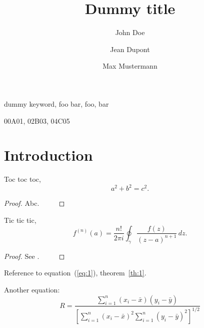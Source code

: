 \documentclass[draft,reqno]{etna}
\title{Dummy title}
\author{John Doe\footnotemark[1]
\and
Jean Dupont\footnotemark[1]
\and
Max Mustermann\footnotemark[2]
}
\begin{document}
\maketitle



\begin{abstract}
  \lipsum[1]
\end{abstract}

\begin{keywords}
   dummy keyword, foo bar, foo, bar
\end{keywords}

\begin{AMS}
  00A01, 02B03, 04C05
\end{AMS}

\section{Introduction}
\lipsum[2]

\begin{theorem}[Pythagoras]
Toc toc toc,
\begin{equation}
a^2 + b^2 = c^2.
\end{equation}
\end{theorem}
\begin{proof}
  Abc. $\qquad$
\end{proof}

\lipsum[3]

\begin{theorem}[Cauchy]\label{th:1}
  Tic tic tic,
  \begin{equation}\label{eq:1}
    f^{(n)}(a) = \frac{n!}{2\pi i} \oint_\gamma \frac{f(z)}{(z-a)^{n+1}}\, dz.
  \end{equation}
\end{theorem}
\begin{proof}
See \cite{cauchy1821cours}. $\qquad$
\end{proof}

Reference to equation~(\ref{eq:1}), theorem~\ref{th:1}.

Another equation:
\begin{equation}
  R = \frac{\displaystyle{\sum_{i=1}^n (x_i-\bar{x})(y_i-
\bar{y})}}{\displaystyle{\left[
\sum_{i=1}^n(x_i-\bar{x})^2
\sum_{i=1}^n(y_i-\bar{y})^2\right]^{1/2}}}
\end{equation}
\end{document}
